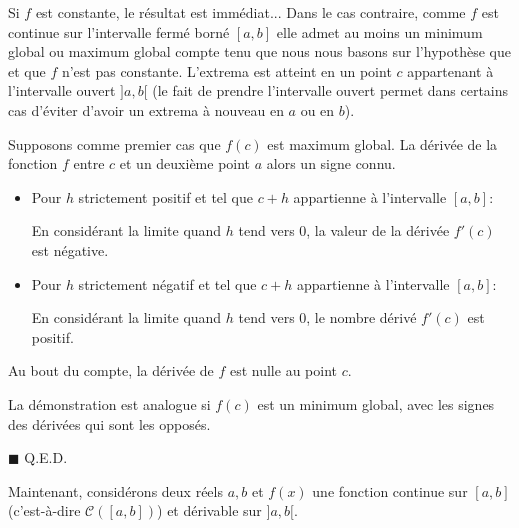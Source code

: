 	\begin{dem}
	Si $f$ est constante, le résultat est immédiat... Dans le cas contraire, comme $f$ est continue sur l'intervalle fermé borné $[a, b]$ elle admet au moins un minimum global ou maximum global compte tenu que nous nous basons sur l'hypothèse que et que $f$ n'est pas constante. L'extrema est atteint en un point $c$ appartenant à l'intervalle ouvert $] a, b [$ (le fait de prendre l'intervalle ouvert permet dans certains cas d'éviter d'avoir un extrema à nouveau en $a$ ou en $b$).
	
	Supposons comme premier cas que $f(c)$ est maximum global. La dérivée de la fonction $f$ entre $c$ et un deuxième point $a$ alors un signe connu.
	\begin{itemize}
		\item Pour $h$ strictement positif et tel que $c + h$ appartienne à l'intervalle $[a, b]$:
		
		En considérant la limite quand $h$ tend vers $0$, la valeur de la dérivée $f'(c)$ est négative.
	
		 \item Pour $h$ strictement négatif et tel que $c + h$ appartienne à l'intervalle $[a, b]$:
		
		En considérant la limite quand $h$ tend vers $0$, le nombre dérivé $f'(c)$ est positif.
	\end{itemize}
	Au bout du compte, la dérivée de $f$ est nulle au point $c$.
	
	La démonstration est analogue si $f(c)$ est un minimum global, avec les signes des dérivées qui sont les opposés.
	\begin{flushright}
		$\blacksquare$  Q.E.D.
	\end{flushright}
	\end{dem}
	Maintenant, considérons deux réels $a,b$ et $f(x)$ une fonction continue sur $[a, b]$ (c'est-à-dire $\mathcal{C}([a,b])$) et dérivable sur $] a, b [$.

